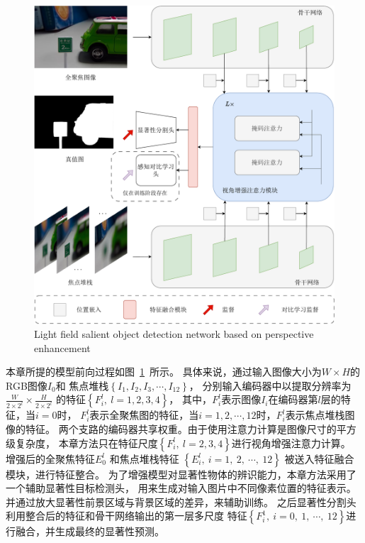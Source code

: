 % 
% 
%
%
%
%
%
\begin{figure}[!ht]
	\centering
	\includegraphics[width=0.95\linewidth]{figures/chapter4/chpt4_overview}
	{Light field salient object detection network based on perspective enhancement}  
	\label{cpt4_fig1:chpt4_overview}
\end{figure}
%
%
%
%
%






本章所提的模型前向过程如图~\ref{cpt4_fig1:chpt4_overview}~所示。
具体来说，通过输入图像大小为$W \times H$的RGB图像$I_{0}$和
焦点堆栈$\left \{  I_{1},I_{2},I_{3},\cdots,I_{12} \right \} $，
分别输入编码器中以提取分辨率为$\frac{W}{2 \times 2^{l}} \times \frac{H}{2  \times 2^{l}} $ 
的特征$\left \{ F_{i}^{l},~l=1,2,3,4 \right \}$，
其中，$F_{i}^{l}$表示图像$I_{i}$在编码器第$l$层的特征，当$i=0$时，
$F_{i}^{l}$表示全聚焦图的特征，当$i=1,2,\cdots,12$时，$F_{i}^{l}$表示焦点堆栈图像的特征。
两个支路的编码器共享权重。由于使用注意力计算是图像尺寸的平方级复杂度，
本章方法只在特征尺度$\left \{ F_{i}^{l},~ l = 2, 3, 4\right \}$进行视角增强注意力计算。
增强后的全聚焦特征$ E_{0}^{l} $ 和焦点堆栈特征 $\left \{ E_{i}^{l},~i=1,~2,~ \cdots,~12 \right \}$
被送入特征融合模块，进行特征整合。
为了增强模型对显著性物体的辨识能力，本章方法采用了一个辅助显著性目标检测头，
用来生成对输入图片中不同像素位置的特征表示。并通过放大显著性前景区域与背景区域的差异，来辅助训练。
之后显著性分割头利用整合后的特征和骨干网络输出的第一层多尺度
特征$\left \{ F_{i}^{1},~i=0,~1,~ \cdots, ~12 \right \}$进行融合，并生成最终的显著性预测。
%
%
%
%
%
%





